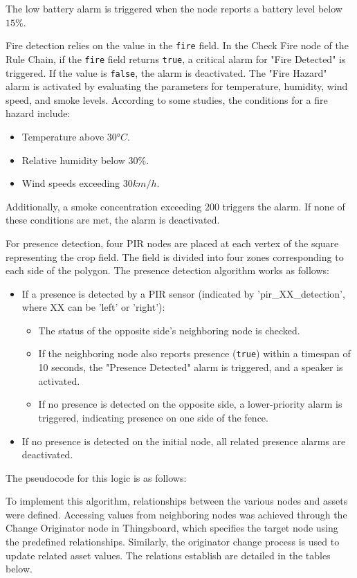 The low battery alarm is triggered when the node reports a battery level below $15\%$.

Fire detection relies on the value in the \texttt{fire} field. In the Check Fire node of the Rule Chain, if the \texttt{fire} field returns \texttt{true}, a critical alarm for "Fire Detected"
is triggered. If the value is \texttt{false}, the alarm is deactivated.
\clearpage
The "Fire Hazard" alarm is activated by evaluating the parameters for temperature, humidity, wind speed, and smoke levels. According to some studies\cite{norma303030tres}, the conditions 
for a fire hazard include:
\begin{itemize}
    \item Temperature above $30$°$C$.
    \item Relative humidity below $30\%$.
    \item Wind speeds exceeding $30 km/h$.
\end{itemize}

Additionally, a smoke concentration exceeding 200  triggers the alarm. If none of these conditions are met, the alarm is deactivated.

For presence detection, four PIR nodes are placed at each vertex of the square representing the crop field. The field is divided into four zones corresponding to each side 
of the polygon. The presence detection algorithm works as follows:
\begin{itemize}
    \item If a presence is detected by a PIR sensor (indicated by 'pir\_XX\_detection', where XX can be 'left' or 'right'):
    \begin{itemize}
        \item The status of the opposite side’s neighboring node is checked.
        \item If the neighboring node also reports presence (\texttt{true}) within a timespan of 10 seconds, the "Presence Detected" alarm is triggered, and a speaker is activated.
        \item If no presence is detected on the opposite side, a lower-priority alarm is triggered, indicating presence on one side of the fence.
    \end{itemize}
    \item If no presence is detected on the initial node, all related presence alarms are deactivated. 
\end{itemize}

The pseudocode for this logic is as follows:

\clearpage
To implement this algorithm, relationships between the various nodes and assets were defined. Accessing values from neighboring nodes was achieved through the Change
Originator node in Thingsboard, which specifies the target node using the predefined relationships. Similarly, the originator change process is used to update related 
asset values. The relations establish are detailed in the tables below.

